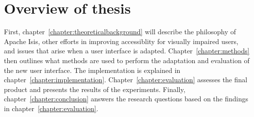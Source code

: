 \section{Overview of thesis}
\label{section:overviewofthesis}
First, chapter~\ref{chapter:theoreticalbackground} will describe the philosophy of Apache Isis, other efforts in improving accessiblity for visually impaired users, and issues that arise when a user interface is adapted. Chapter~\ref{chapter:methods} then outlines what methods are used to perform the adaptation and evaluation of the new user interface. The implementation is explained in chapter~\ref{chapter:implementation}. Chapter~\ref{chapter:evaluation} assesses the final product and presents the results of the experiments. Finally, chapter~\ref{chapter:conclusion} answers the research questions based on the findings in chapter~\ref{chapter:evaluation}.